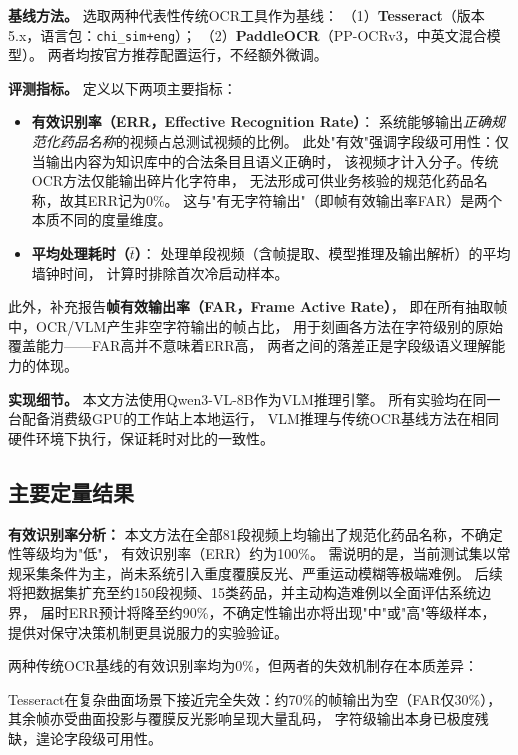 \documentclass[12pt, a4paper]{article}
\begin{document}
\noindent\textbf{基线方法。}
选取两种代表性传统OCR工具作为基线：
（1）\textbf{Tesseract}（版本5.x，语言包：\texttt{chi\_sim+eng}）；
（2）\textbf{PaddleOCR}（PP-OCRv3，中英文混合模型）。
两者均按官方推荐配置运行，不经额外微调。

\noindent\textbf{评测指标。}
定义以下两项主要指标：
\begin{itemize}
  \item \textbf{有效识别率（ERR，Effective Recognition Rate）}：
        系统能够输出\emph{正确规范化药品名称}的视频占总测试视频的比例。
        此处"有效"强调字段级可用性：仅当输出内容为知识库中的合法条目且语义正确时，
        该视频才计入分子。传统OCR方法仅能输出碎片化字符串，
        无法形成可供业务核验的规范化药品名称，故其ERR记为0\%。
        这与"有无字符输出"（即帧有效输出率FAR）是两个本质不同的度量维度。
  \item \textbf{平均处理耗时（$\bar{t}$）}：
        处理单段视频（含帧提取、模型推理及输出解析）的平均墙钟时间，
        计算时排除首次冷启动样本。
\end{itemize}

此外，补充报告\textbf{帧有效输出率（FAR，Frame Active Rate）}，
即在所有抽取帧中，OCR/VLM产生非空字符输出的帧占比，
用于刻画各方法在字符级别的原始覆盖能力——FAR高并不意味着ERR高，
两者之间的落差正是字段级语义理解能力的体现。

\noindent\textbf{实现细节。}
本文方法使用Qwen3-VL-8B\cite{ref:qwen3vl}作为VLM推理引擎。
所有实验均在同一台配备消费级GPU的工作站上本地运行，
VLM推理与传统OCR基线方法在相同硬件环境下执行，保证耗时对比的一致性。

\subsection{主要定量结果}
\label{sec:exp:main}

\noindent\textbf{有效识别率分析：}
本文方法在全部81段视频上均输出了规范化药品名称，不确定性等级均为"低"，
有效识别率（ERR）约为100\%。
需说明的是，当前测试集以常规采集条件为主，尚未系统引入重度覆膜反光、严重运动模糊等极端难例。
后续将把数据集扩充至约150段视频、15类药品，并主动构造难例以全面评估系统边界，
届时ERR预计将降至约90\%，不确定性输出亦将出现"中"或"高"等级样本，
提供对保守决策机制更具说服力的实验验证。

两种传统OCR基线的有效识别率均为0\%，但两者的失效机制存在本质差异：

Tesseract在复杂曲面场景下接近完全失效：约70\%的帧输出为空（FAR仅30\%），
其余帧亦受曲面投影与覆膜反光影响呈现大量乱码，
字符级输出本身已极度残缺，遑论字段级可用性。
\end{document}
